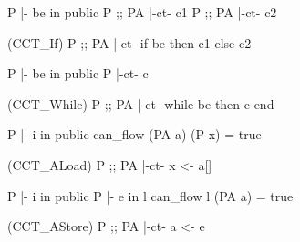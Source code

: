 \documentclass[12pt]{report}
\begin{document}
  P |- be in public    P ;; PA |-ct- c1    P ;; PA |-ct- c2
\par
\noindent\hrulefill\par
\noindent{} (CCT\_If)
               P ;; PA |-ct- if be then c1 else c2


                  P |- be in public    P |-ct- c
\par
\noindent\hrulefill\par
\noindent{}         (CCT\_While)
                  P ;; PA |-ct- while be then c end


      P |- i in public   can\_flow (PA a) (P x) = true
\par
\noindent\hrulefill\par
\noindent{}   (CCT\_ALoad)
                  P ;; PA |-ct- x <- a[]


P |- i in public   P |- e in l   can\_flow l (PA a) = true
\par
\noindent\hrulefill\par
\noindent{} (CCT\_AStore)
                   P ;; PA |-ct- a <- e
\end{document}
